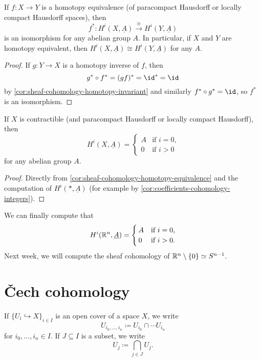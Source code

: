 \begin{cor}\label{cor:sheaf-cohomology-homotopy-equivalence}
If \(f\colon X\to Y\) is a homotopy equivalence (of paracompact Hausdorff or locally compact Hausdorff spaces), then
\[ f^*\colon H^i(X,\underline{A})\xrightarrow{\cong} H^i(Y,\underline{A}) \]
is an isomorphism for any abelian group \(A\).
In particular, if \(X\) and \(Y\) are homotopy equivalent, then \(H^i(X,\underline{A})\cong H^i(Y,\underline{A})\) for any \(A\).
\end{cor}
\begin{proof}
If \(g\colon Y\to X\) is a homotopy inverse of \(f\), then
\[ g^*\circ f^* = (gf)^* = \id^* = \id \]
by \cref{cor:sheaf-cohomology-homotopy-invariant} and similarly \(f^*\circ g^*=\id\), so \(f^*\) is an isomorphism.
\end{proof}

\begin{cor}
If \(X\) is contractible (and paracompact Hausdorff or locally compact Hausdorff), then
\[ H^i(X,\underline{A}) =
  \begin{cases}
    A & \text{if } i = 0\text{,} \\
    0 & \text{if } i > 0
  \end{cases}
\]
for any abelian group \(A\).
\end{cor}
\begin{proof}
Directly from \cref{cor:sheaf-cohomology-homotopy-equivalence} and the computation of \(H^i(*,\underline{A})\) (for example by \cref{cor:coefficients-cohomology-integers}).
\end{proof}

\begin{exmp}
We can finally compute that
\[ H^i(\mathbb{R}^n,\underline{A}) =
  \begin{cases}
    A & \text{if } i = 0\text{,} \\
    0 & \text{if } i > 0\text{.}
  \end{cases}
\]
Next week, we will compute the sheaf cohomology of \(\bb R^n\setminus\{0\}\simeq\sphere[n-1]\).
\end{exmp}

\section{Čech cohomology}

\begin{notn}
If \(\{U_i\hookrightarrow X\}_{i\in I}\) is an open cover of a space \(X\), we write
\[ U_{i_0,\ldots,i_n} \coloneq U_{i_0} \cap \cdots U_{i_n} \]
for \(i_0,\ldots,i_n\in I\).
If \(J\subseteq I\) is a subset, we write
\[ U_j \coloneq \bigcap_{j\in J}U_j\text{.} \]
\end{notn}

